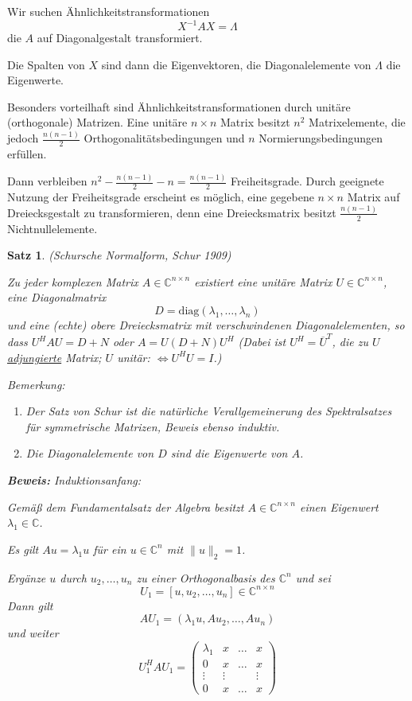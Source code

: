 \documentclass[%
a4paper,
11pt,		%
leqno,		%
]
{scrartcl}
\theoremstyle{plain}
\theoremstyle{plain}
\newtheorem{mysatz}[mydef]{Satz}
\begin{document}
Wir suchen Ähnlichkeitstransformationen 
\[
X^{-1}AX = \Lambda
\]
die $A$ auf Diagonalgestalt transformiert.

Die Spalten von $X$ sind dann die Eigenvektoren, die Diagonalelemente von $\Lambda$ die Eigenwerte.

Besonders vorteilhaft sind Ähnlichkeitstransformationen durch unitäre (orthogonale) Matrizen. Eine unitäre $n \times n$ Matrix besitzt $n^2$ Matrixelemente, die jedoch $\frac{n(n-1)}{2}$ Orthogonalitätsbedingungen und $n$ Normierungsbedingungen erfüllen.

Dann verbleiben $n^2 - \frac{n(n-1)}{2} -n = \frac{n(n-1)}{2}$ Freiheitsgrade. Durch geeignete Nutzung der Freiheitsgrade erscheint es möglich, eine gegebene $n \times n$ Matrix auf Dreiecksgestalt zu transformieren, denn eine Dreiecksmatrix besitzt $\frac{n(n-1)}{2}$ Nichtnullelemente.

\begin{mysatz}
(Schursche Normalform, Schur 1909)

Zu jeder komplexen Matrix $A \in \mathbb{C}^{n \times n}$ existiert eine unitäre Matrix $U \in \mathbb{C}^{n \times n}$, eine Diagonalmatrix 
\[
D = \text{diag}(\lambda_1, \ldots, \lambda_n)
\]
und eine (echte) obere Dreiecksmatrix mit verschwindenen Diagonalelementen, so dass $ U^H A U = D + N$ oder $A = U(D+N)U^H$
(Dabei ist $U^H = \overline{U}^T$, die zu $U$ \uline{adjungierte} Matrix; $U$ unitär: $\Leftrightarrow U^HU = I$.)

\textit{Bemerkung:}
\begin{enumerate}
    \item Der Satz von Schur ist die natürliche Verallgemeinerung des Spektralsatzes für symmetrische Matrizen, Beweis ebenso induktiv.
    \item Die Diagonalelemente von $D$ sind die Eigenwerte von $A$.
\end{enumerate}
\textbf{Beweis:} Induktionsanfang:

Gemäß dem Fundamentalsatz der Algebra besitzt $A \in \mathbb{C}^{n \times n}$ einen Eigenwert $\lambda_1 \in \mathbb{C}$.

Es gilt $Au = \lambda_1 u$ für ein $u \in \mathbb{C}^n$ mit $\| u \|_2 = 1$.

Ergänze $u$ durch $u_2, \ldots, u_n$ zu einer Orthogonalbasis des $\mathbb{C}^n$ und sei
\[
U_1 = \left[ u, u_2, \ldots, u_n \right] \in \mathbb{C}^{n \times n}
\]
Dann gilt
\[
AU_1 = \left( \lambda_1 u, Au_2, \ldots, Au_n \right)
\]
und weiter
\[
U_1^H A U_1 = 
\begin{pmatrix}
\lambda_1 & x & \dots & x\\
0 & x & \dots & x\\
\vdots & \vdots & & \vdots\\
0 & x & \dots &  x
\end{pmatrix}
\]
\end{mysatz}


\end{document}
